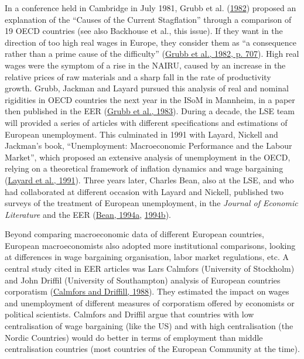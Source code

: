 \documentclass[
  12pt,
  onecolumn]{article}
\begin{document}
In a conference held in Cambridge in July 1981, Grubb et al.
(\protect\hyperlink{ref-grubb1982}{1982}) proposed an explanation of the
``Causes of the Current Stagflation'' through a comparison of 19 OECD
countries (see also Backhouse et al., this issue). If they want in the
direction of too high real wages in Europe, they consider them as ``a
consequence rather than a prime cause of the difficulty''
(\protect\hyperlink{ref-grubb1982}{Grubb et al., 1982, p. 707}). High
real wages were the symptom of a rise in the NAIRU, caused by an
increase in the relative prices of raw materials and a sharp fall in the
rate of productivity growth. Grubb, Jackman and Layard pursued this
analysis of real and nominal rigidities in OECD countries the next year
in the ISoM in Mannheim, in a paper then published in the EER
(\protect\hyperlink{ref-grubb1983a}{Grubb et al., 1983}). During a
decade, the LSE team will provided a series of articles with different
specifications and estimations of European unemployment. This culminated
in 1991 with Layard, Nickell and Jackman's book, ``Unemployment:
Macroeconomic Performance and the Labour Market'', which proposed an
extensive analysis of unemployment in the OECD, relying on a theoretical
framework of inflation dynamics and wage bargaining
(\protect\hyperlink{ref-layard1991a}{Layard et al., 1991}). Three years
later, Charles Bean, also at the LSE, and who had collaborated at
different occasion with Layard and Nickell, published two surveys of the
treatment of European unemployment, in the \emph{Journal of Economic
Literature} and the EER (\protect\hyperlink{ref-bean1994}{Bean, 1994a},
\protect\hyperlink{ref-bean1994a}{1994b}).

Beyond comparing macroeconomic data of different European countries,
European macroeconomists also adopted more institutional comparisons,
looking at differences in wage bargaining organisation, labor market
regulations, etc. A central study cited in EER articles was Lars
Calmfors (University of Stockholm) and John Driffil (University of
Southampton) analysis of European countries corporatism
(\protect\hyperlink{ref-calmfors1988}{Calmfors and Driffill, 1988}).
They estimated the impact on wages and unemployment of different
measures of corporatism offered by economists or political scientists.
Calmfors and Driffil argue that countries with low centralisation of
wage bargaining (like the US) and with high centralisation (the Nordic
Countries) would do better in terms of employment than middle
centralisation countries (most countries of the European Community at
the time).
\end{document}
